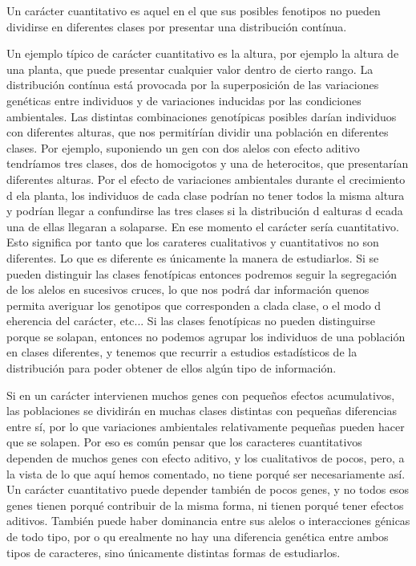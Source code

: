 \documentclass[a4paper]{article}
\begin{document}
Un carácter cuantitativo es aquel en el que sus posibles fenotipos no pueden dividirse en diferentes clases por presentar una distribución contínua.

Un ejemplo típico de carácter cuantitativo es la altura, por ejemplo la altura de una planta, que puede presentar cualquier valor dentro de cierto rango. La distribución contínua está provocada por la superposición de las variaciones genéticas entre individuos y de variaciones inducidas por las condiciones ambientales. Las distintas combinaciones genotípicas posibles darían individuos con diferentes alturas, que nos permitírían dividir una población en diferentes clases. Por ejemplo, suponiendo un gen con dos alelos con efecto aditivo tendríamos tres clases, dos de homocigotos y una de heterocitos, que presentarían diferentes alturas. Por el efecto de variaciones ambientales durante el crecimiento d ela planta, los individuos de cada clase podrían no tener todos la misma altura y podrían llegar a confundirse las tres clases si la distribución d ealturas d ecada una de ellas llegaran a solaparse. En ese momento el carácter sería cuantitativo. Esto significa por tanto que los carateres cualitativos y cuantitativos no son diferentes. Lo que es diferente es únicamente la manera de estudiarlos. Si se pueden distinguir las clases fenotípicas entonces podremos seguir la segregación de los alelos en sucesivos cruces, lo que nos podrá dar información quenos permita averiguar los genotipos que corresponden a clada clase, o el modo d eherencia del carácter, etc... Si las clases fenotípicas no pueden distinguirse porque se solapan, entonces no podemos agrupar los individuos de una población en clases diferentes, y tenemos que recurrir a estudios estadísticos de la distribución para poder obtener de ellos algún tipo de información.

Si en un carácter intervienen muchos genes con pequeños efectos acumulativos, las poblaciones se dividirán en muchas clases distintas con pequeñas diferencias entre sí, por lo que variaciones ambientales relativamente pequeñas pueden hacer que se solapen. Por eso es común pensar que los caracteres cuantitativos dependen de muchos genes con efecto aditivo, y los cualitativos de pocos, pero, a la vista de lo que aquí hemos comentado, no tiene porqué ser necesariamente así. Un carácter cuantitativo puede depender también de pocos genes, y no todos esos genes tienen porqué contribuir de la misma forma, ni tienen porqué tener efectos aditivos. También puede haber dominancia entre sus alelos o interacciones génicas de todo tipo, por o qu erealmente no hay una diferencia genética entre ambos tipos de caracteres, sino únicamente distintas formas de estudiarlos. 
\end{document}
